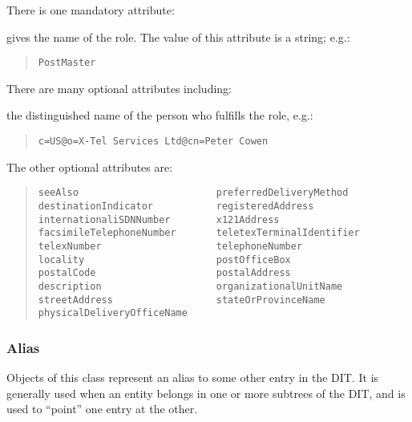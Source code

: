 There is one mandatory attribute:
\begin{describe}
\item[\verb+commonName+:]	gives the name of the role.
			The value of this attribute is a string; e.g.:
\begin{quote}\small\begin{verbatim}
PostMaster
\end{verbatim}\end{quote}
\end{describe}

There are many optional attributes including:
\begin{describe}
\item[\verb+roleOccupant+:]    the distinguished name of the person 
			who fulfills the role, e.g.:
\begin{quote}\small\begin{verbatim}
c=US@o=X-Tel Services Ltd@cn=Peter Cowen
\end{verbatim}\end{quote}
\end{describe}

The other optional attributes are:
\begin{quote}\small\begin{verbatim}
seeAlso                        preferredDeliveryMethod
destinationIndicator           registeredAddress
internationaliSDNNumber        x121Address
facsimileTelephoneNumber       teletexTerminalIdentifier
telexNumber                    telephoneNumber
locality                       postOfficeBox
postalCode                     postalAddress
description                    organizationalUnitName
streetAddress                  stateOrProvinceName
physicalDeliveryOfficeName
\end{verbatim}\end{quote}


\subsubsection{Alias}
Objects of this class represent an alias to some other entry in the
DIT.  It is generally used when an entity belongs in one or more subtrees of
the DIT, and is used to ``point'' one entry at the other.

